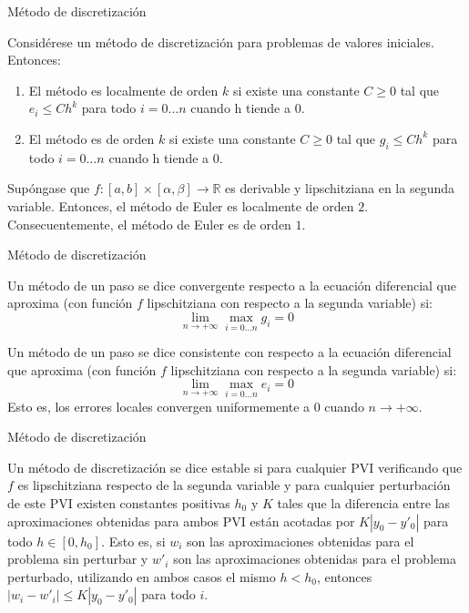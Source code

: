 		\begin{frame}{Método de discretización}
			\fontsize{11}{11}\selectfont
			\begin{definition}
				Considérese un método de discretización para problemas de valores iniciales. Entonces:
				\begin{enumerate}
					\item El método es localmente de orden $k$ si existe una constante $C \ge 0$ tal que $e_i \le C h^k$ para todo $i = 0 \ldots n$ cuando h tiende a 0.
					\item El método es de orden $k$ si existe una constante $C \ge 0$ tal que $g_i \le C h^k$ para todo $i = 0 \ldots n$ cuando h tiende a 0.
				\end{enumerate}
			\end{definition}
			
			\begin{theorem} \label{theorem:euler:error}
				Supóngase que $f: [a,b] \times [\alpha, \beta] \rightarrow \mathbb{R}$ es derivable y lipschitziana en la segunda variable. Entonces, el método de Euler es localmente de orden $2$. Consecuentemente, el método de Euler es de orden $1$.
			\end{theorem}	
		\end{frame}
			
		\begin{frame}{Método de discretización}		
			\begin{definition}
			Un método de un paso se dice convergente respecto a la ecuación diferencial que aproxima (con función $f$ lipschitziana con respecto a la segunda variable) si:
			$$ \lim_{n \rightarrow +\infty} \max_{i = 0 \ldots n} g_i = 0 $$
			\end{definition}
	
		    \begin{definition}
		    	Un método de un paso se dice consistente con respecto a la ecuación diferencial que aproxima (con función $f$ lipschitziana con respecto a la segunda variable) si:
		    	$$ \lim_{n \rightarrow +\infty} \max_{i = 0 \ldots n} e_i = 0 $$
		    	Esto es, los errores locales convergen uniformemente a 0 cuando $n \rightarrow +\infty$.
		    \end{definition}
		\end{frame}	
			
		\begin{frame}{Método de discretización}
			\begin{definition}
				Un método de discretización se dice estable si para cualquier PVI verificando que $f$ es lipschitziana respecto de la segunda variable y para cualquier perturbación de este PVI existen constantes positivas $h_0$ y $K$ tales que la diferencia entre las aproximaciones obtenidas para ambos PVI están acotadas por $K |y_0 - y'_0|$ para todo $h \in [0,h_0]$. Esto es, si $w_i$ son las aproximaciones obtenidas para el problema sin perturbar y $w'_i$ son las aproximaciones obtenidas para el problema perturbado, utilizando en ambos casos el mismo $h < h_0$, entonces $\left|w_i - w'_i\right| \le K |y_0 - y'_0|$ para todo $i$.
			\end{definition}
		\end{frame}
		
